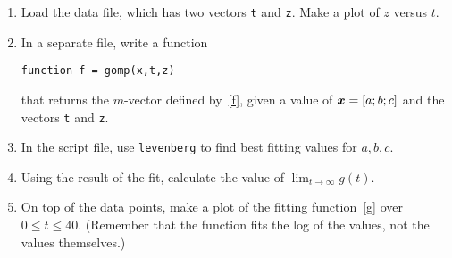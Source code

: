 \documentclass[11pt]{article}
\begin{document}
\begin{enumerate}
    \item Load the data file, which has two vectors \texttt{t} and \texttt{z}. Make a plot of $z$ versus $t$. 
     
    \item In a separate file, write a function 
\begin{verbatim}
function f = gomp(x,t,z)
\end{verbatim}
    that returns the $m$-vector defined by~\eqref{f}, given a value of $\bm{x}=[a;b;c]$ and the vectors \texttt{t} and \texttt{z}.
    
    \item In the script file, use \texttt{levenberg} to find best fitting values for $a,b,c$. 
    
    \item Using the result of the fit, calculate the value of $\lim_{t\to\infty} g(t)$. 
    
    \item On top of the data points, make a plot of the fitting function~\eqref{g} over $0\le t \le 40$. (Remember that the function fits the log of the values, not the values themselves.)
\end{enumerate}
\end{document}
